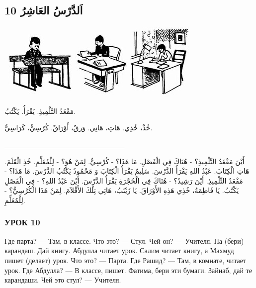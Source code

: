 \documentclass[a5paper]{article}
\begin{document}
\subsection{10 اَلدَّرْسُ العَاشِرُ}
 \includegraphics[width=1.4374in,height=1.4791in]{MuhammadBagauddinlatinized-img014.jpg}   \includegraphics[width=1.0937in,height=1.4689in]{MuhammadBagauddinlatinized-img015.jpg}   \includegraphics[width=1.2398in,height=1.4689in]{MuhammadBagauddinlatinized-img016.jpg} 

مَقْعَدُ التِّلْمِيذِ. يَقْرَأُ. يَكْتُبُ.

خُذْ، خُذِي. هَاتِ، هَاتِي. وَرقٌ، أَوْرَاقٌ. كُرْسِيٌّ، كَرَاسِيُّ.

\_\_\_\_\_\_\_\_\_\_\_\_\_\_\_\_\_\_\_\_\_\_\_ 

أَيْنَ مَقْعَدُ التِّلْمِيذِ؟ - هُنَاكَ فِي الْفَصْلِ. مَا هَذَا؟ - كُرْسِيٌّ. لِمَنْ هُوَ؟ - لِلْمُعَلِّمِ. خُذِ الْقَلَمَ. هَاتِ الْكِتَابَ. عَبْدُ اللهِ يَقْرَأُ الدَّرْسَ. سَلِيمٌ يَقْرَأُ الْكِتَابَ وَ مَحْمُودٌ يَكْتُبُ الدَّرْسَ. مَا هَذَا؟ - مَقْعَدُ التِّلْمِيذِ. أَيْنَ رَشِيدٌ؟ - هُنَاكَ فِي الْحُجْرَةِ يَقْرَأُ الدَّرْسَ. أَيْنَ عَبْدُ اللهِ؟ - فِي الْفَصْلِ يَكْتُبُ. يَا فَاطِمَةُ، خُذِي هَذِهِ الأَوْرَاقَ. يَا زَيْنَبُ، هَاتِي تِلْكَ الأَقْلاَمَ. لِمَنْ هَذَا الْكُرْسِيُّ؟ - لِلْمُعَلِّمِ.

\subsubsection{УРОК 10}
Где парта? — Там, в классе. Что это? — Стул. Чей он? — Учителя. На (бери) карандаш. Дай книгу. Абдулла читает урок. Салим читает книгу, а Махмуд пишет (делает) урок. Что это? — Парта. Где Рашид? — Там, в комнате, читает урок. Где Абдулла? — В классе, пишет. Фатима, бери эти бумаги. Зайнаб, дай те карандаши. Чей это стул? — Учителя.
\end{document}

